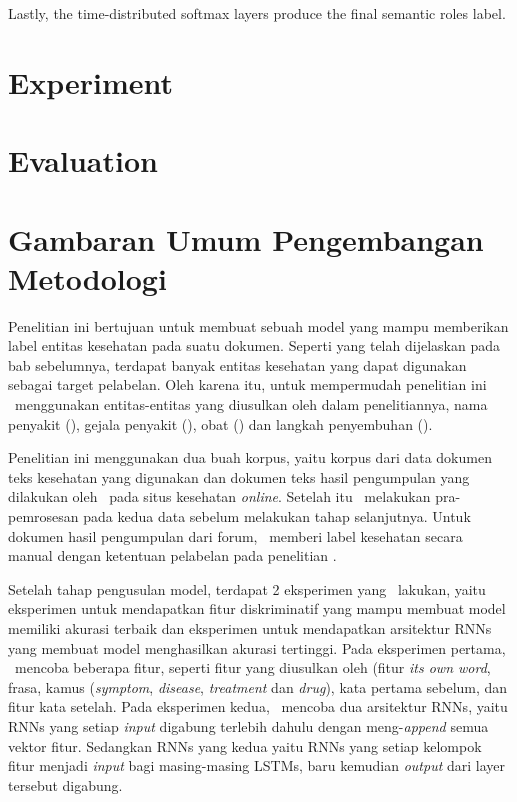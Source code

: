 Lastly, the time-distributed softmax layers produce the final semantic roles label.


\section{Experiment}

\section{Evaluation}



\section{Gambaran Umum Pengembangan Metodologi}
Penelitian ini bertujuan untuk membuat sebuah model yang mampu memberikan label entitas kesehatan pada suatu dokumen. Seperti yang telah dijelaskan pada bab sebelumnya, terdapat banyak entitas kesehatan yang dapat digunakan sebagai target pelabelan. Oleh karena itu, untuk mempermudah penelitian ini \saya~menggunakan entitas-entitas yang diusulkan oleh \cite{skripsiKakRadit} dalam penelitiannya,  nama penyakit (\textit{\disease}), gejala penyakit (\textit{\symptom}), obat (\textit{\drug}) dan langkah penyembuhan (\textit{\treatment}).

Penelitian ini menggunakan dua buah korpus, yaitu korpus dari data dokumen teks kesehatan yang digunakan \cite{skripsiKakRadit} dan dokumen teks hasil pengumpulan yang dilakukan oleh \saya~pada situs kesehatan \textit{online}. Setelah itu \saya~melakukan pra-pemrosesan pada kedua data sebelum melakukan tahap selanjutnya. Untuk dokumen hasil pengumpulan dari forum, \saya~memberi label kesehatan secara manual dengan ketentuan pelabelan pada penelitian \cite{skripsiKakRadit}.

Setelah tahap pengusulan model, terdapat 2 eksperimen yang \saya~lakukan, yaitu eksperimen untuk mendapatkan fitur diskriminatif yang mampu membuat model memiliki akurasi terbaik dan eksperimen untuk mendapatkan arsitektur RNNs yang membuat model menghasilkan akurasi tertinggi. Pada eksperimen pertama, \saya~mencoba beberapa fitur, seperti fitur yang diusulkan oleh \cite{skripsiKakRadit} (fitur \textit{its own word}, frasa, kamus (\textit{symptom}, \textit{disease}, \textit{treatment} dan \textit{drug}), kata pertama sebelum, dan fitur kata setelah. Pada eksperimen kedua, \saya~mencoba dua arsitektur RNNs, yaitu RNNs yang setiap \textit{input} digabung terlebih dahulu dengan meng-\textit{append} semua vektor fitur. Sedangkan RNNs yang kedua yaitu RNNs yang setiap kelompok fitur menjadi \textit{input} bagi masing-masing LSTMs, baru kemudian \textit{output} dari layer tersebut digabung.

